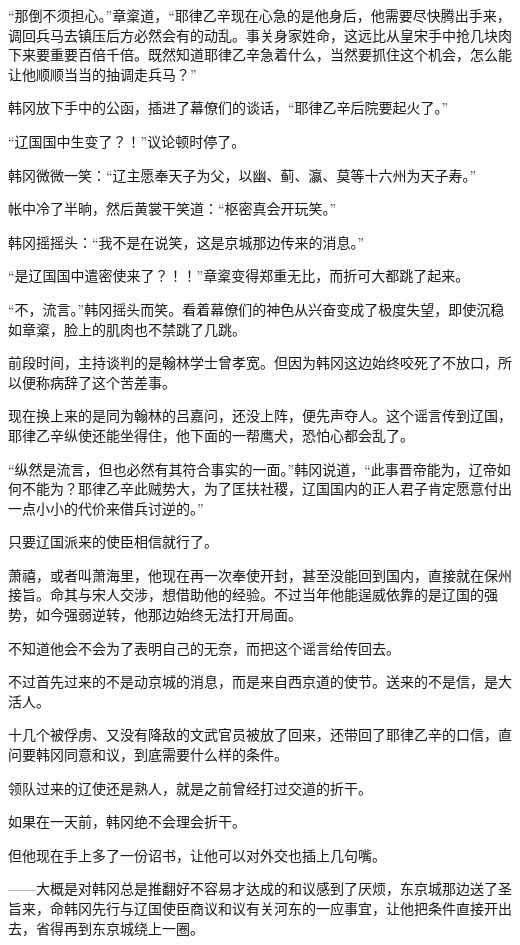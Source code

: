 “那倒不须担心。”章楶道，“耶律乙辛现在心急的是他身后，他需要尽快腾出手来，调回兵马去镇压后方必然会有的动乱。事关身家姓命，这远比从皇宋手中抢几块肉下来要重要百倍千倍。既然知道耶律乙辛急着什么，当然要抓住这个机会，怎么能让他顺顺当当的抽调走兵马？”

韩冈放下手中的公函，插进了幕僚们的谈话，“耶律乙辛后院要起火了。”

“辽国国中生变了？！”议论顿时停了。

韩冈微微一笑：“辽主愿奉天子为父，以幽、蓟、瀛、莫等十六州为天子寿。”

帐中冷了半晌，然后黄裳干笑道：“枢密真会开玩笑。”

韩冈摇摇头：“我不是在说笑，这是京城那边传来的消息。”

“是辽国国中遣密使来了？！！”章楶变得郑重无比，而折可大都跳了起来。

“不，流言。”韩冈摇头而笑。看着幕僚们的神色从兴奋变成了极度失望，即使沉稳如章楶，脸上的肌肉也不禁跳了几跳。

前段时间，主持谈判的是翰林学士曾孝宽。但因为韩冈这边始终咬死了不放口，所以便称病辞了这个苦差事。

现在换上来的是同为翰林的吕嘉问，还没上阵，便先声夺人。这个谣言传到辽国，耶律乙辛纵使还能坐得住，他下面的一帮鹰犬，恐怕心都会乱了。

“纵然是流言，但也必然有其符合事实的一面。”韩冈说道，“此事晋帝能为，辽帝如何不能为？耶律乙辛此贼势大，为了匡扶社稷，辽国国内的正人君子肯定愿意付出一点小小的代价来借兵讨逆的。”

只要辽国派来的使臣相信就行了。

萧禧，或者叫萧海里，他现在再一次奉使开封，甚至没能回到国内，直接就在保州接旨。命其与宋人交涉，想借助他的经验。不过当年他能逞威依靠的是辽国的强势，如今强弱逆转，他那边始终无法打开局面。

不知道他会不会为了表明自己的无奈，而把这个谣言给传回去。

不过首先过来的不是动京城的消息，而是来自西京道的使节。送来的不是信，是大活人。

十几个被俘虏、又没有降敌的文武官员被放了回来，还带回了耶律乙辛的口信，直问要韩冈同意和议，到底需要什么样的条件。

领队过来的辽使还是熟人，就是之前曾经打过交道的折干。

如果在一天前，韩冈绝不会理会折干。

但他现在手上多了一份诏书，让他可以对外交也插上几句嘴。

——大概是对韩冈总是推翻好不容易才达成的和议感到了厌烦，东京城那边送了圣旨来，命韩冈先行与辽国使臣商议和议有关河东的一应事宜，让他把条件直接开出去，省得再到东京城绕上一圈。

